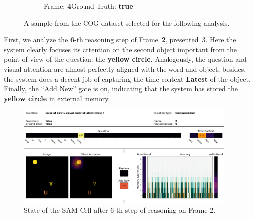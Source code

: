 \begin{figure}[htbp]
\begin{subfigure}{0.25\textwidth}
	\caption{Frame: \textbf{4}\newline Ground Truth: \textbf{true}}
	\label{fig:frame-4}
  \end{subfigure}%
  \hfill\null
  \newline
  \centering
\caption{A sample from the COG dataset selected for the following analysis.} 
\label{fig:example}  
\end{figure}


First, we analyze the \textbf{6}-th reasoning step of Frame~\textbf{2}, presented~\cref{fig:frame-2-step-6}.
Here the system clearly focuses its attention on the second object important from the point of view of the question: the \textbf{yellow circle}.
Analogously, the question and visual attention are almost perfectly aligned with the word and object, besides, 
the system does a decent job of capturing the time context \textbf{Latest} of the object.
Finally, the ``Add New'' gate is on, indicating that the system has stored the \textbf{yellow circle} in external memory.
\begin{figure}[!h]
	\centering
	\includegraphics[width=0.95\textwidth]{"../img/visualization/experiment_run_20190917_022319/Frame 2 Step 6"}
	\caption{State of the SAM Cell after 6-th step of reasoning on Frame 2.} 
	\label{fig:frame-2-step-6}
\end{figure}


